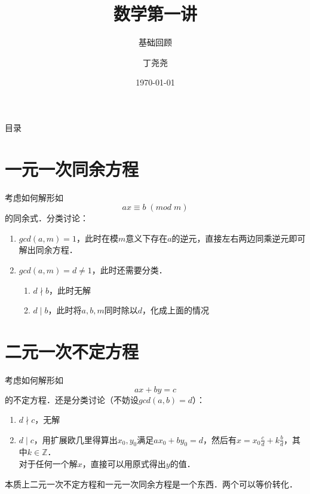 \documentclass{beamer}
\title{数学第一讲}
\subtitle{基础回顾}
\author{丁尧尧}
\institute{上海交通大学}
\date{\today}
\begin{document}
	\maketitle
	\begin{frame}{目录}
		\tableofcontents
	\end{frame}
	
	\section{一元一次同余方程}
		\begin{frame}
			考虑如何解形如
			$$
				ax \equiv b  \; (mod \; m)
			$$
			的同余式．\pause 分类讨论： \pause 
			
			\begin{enumerate}
				\item $gcd(a,m) = 1$，此时在模$m$意义下存在$a$的逆元，直接左右两边同乘逆元即可解出同余方程． \pause 
				\item $gcd(a,m) = d \neq 1$，此时还需要分类．\pause \\
						\begin{enumerate}
							\item $d \nmid b$，此时无解 \pause  
							\item $d \mid b$，此时将$a, b, m$同时除以$d$，化成上面的情况
						\end{enumerate}
			\end{enumerate}
		\end{frame}
	\section{二元一次不定方程}
		\begin{frame}
			考虑如何解形如
			$$
				ax + by = c
			$$
			的不定方程．\pause 还是分类讨论（不妨设$gcd(a,b) = d$）：  
			\pause
			\begin{enumerate}
				\item $d \nmid c$，无解 \pause 
				\item $d \mid c$，用扩展欧几里得算出$x_0, y_0$满足$ax_0 + by_0 = d$，然后有$x = x_0 \frac{c}{d} + k\frac{b}{d}$，其中$k \in \mathbb{Z}$．\\
													对于任何一个解$x$，直接可以用原式得出$y$的值．
			\end{enumerate}
			
		  \pause  本质上二元一次不定方程和一元一次同余方程是一个东西．两个可以等价转化．
		\end{frame}		
		
\end{document}
